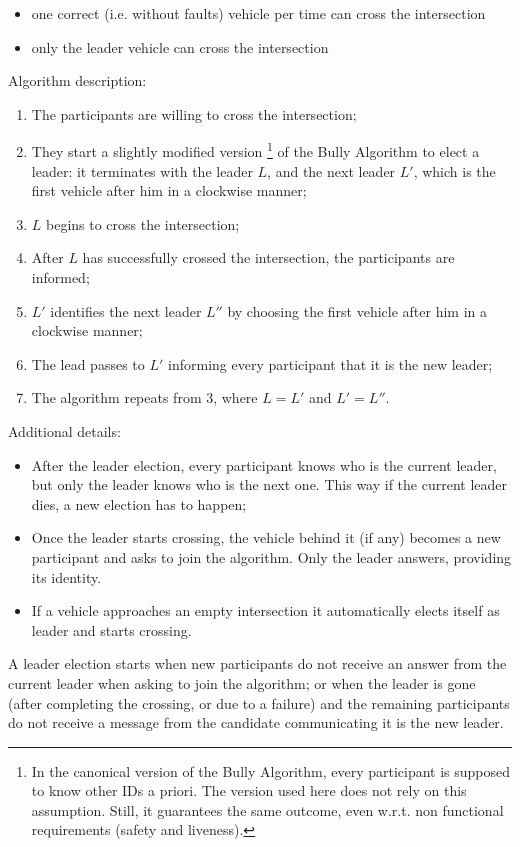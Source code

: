 \documentclass{memoir}
\begin{document}
\begin{itemize}
	\item one correct (i.e. without faults) vehicle per time can cross the intersection
	\item only the leader vehicle can cross the intersection
\end{itemize}
Algorithm description:
\begin{enumerate}
	\item The participants are willing to cross the intersection;
	\item They start a slightly modified version \footnote{In the canonical version of the Bully Algorithm, every participant is supposed to know other IDs a priori. The version used here does not rely on this assumption. Still, it guarantees the same outcome, even w.r.t. non functional requirements (safety and liveness).} of the Bully Algorithm to elect a leader: it terminates with the leader $L$, and the next leader $L'$, which is the first vehicle after him in a clockwise manner;
	\item $L$ begins to cross the intersection;
	\item After $L$ has successfully crossed the intersection, the participants are informed;
	\item $L'$ identifies the next leader $L''$ by choosing the first vehicle after him in a clockwise manner;
	\item The lead passes to $L'$ informing every participant that it is the new leader;
	\item The algorithm repeats from 3, where $L = L'$ and $L' = L''$.
\end{enumerate}
Additional details:
\begin{itemize}
	\item After the leader election, every participant knows who is the current leader, but only the leader knows who is the next one. This way if the current leader dies, a new election has to happen;
	\item Once the leader starts crossing, the vehicle behind it (if any) becomes a new participant and asks to join the algorithm. Only the leader answers, providing its identity.
	\item If a vehicle approaches an empty intersection it automatically elects itself as leader and starts crossing.
\end{itemize}
A leader election starts when new participants do not receive an answer from the current leader when asking to join the algorithm; or when the leader is gone (after completing the crossing, or due to a failure) and the remaining participants do not receive a message from the candidate communicating it is the new leader.
\end{document}
